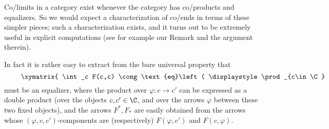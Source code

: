 \begin{remark}\label{endsareeq}
Co/limits in a category exist whenever the category has co/products and equalizers. So we would expect a  characterization of co/ends in terms of these simpler pieces; such a characterization exists, and it turns out to be extremely useful in explicit computations (see for example our Remark  and the argument therein). 

In fact it is rather easy to extract from the bare universal property that
\[
\vcenter{\xymatrix{
\int_c F(c,c) \cong \text{eq}\left( \displaystyle \prod_{c\in\C} F(c,c) \ar@<3pt>[r]^(.6){F^*}\ar@<-3pt>[r]_(.6){F_*}\right.& \left.\displaystyle \prod_{\varphi\colon c\to c'} F(c,c')\right)
}}
\]
must be an equalizer, where the product over ${\varphi\colon c\to c'}$ can be expressed as a double product (over the objects $c,c'\in \C$, and over the arrows $\varphi$ between these two fixed objects), and the arrows $F^*, F_*$ are easily obtained from the arrows whose $(\varphi, c,c')$\hyp{}components are (respectively) $F(\varphi, c')$ and $F(c, \varphi)$.
\end{remark}
